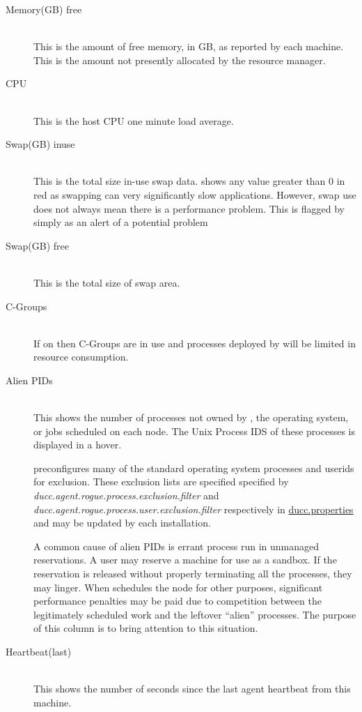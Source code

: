 \begin{description}
      \item[Memory(GB) free] \hfill \\
        This is the amount of free memory, in GB, as reported by each machine.
        This is the amount not presently allocated by the resource manager.
        
      \item[CPU] \hfill \\
        This is the host CPU one minute load average.
        
      \item[Swap(GB) inuse] \hfill \\
        This is the total size in-use swap data.  {\DUCC} shows any value greater than 0 in
        red as swapping can very significantly slow applications.  However, swap use does
        not always mean there is a performance problem.  This is flagged by {\DUCC} simply
        as an alert of a potential problem

      \item[Swap(GB) free] \hfill \\
        This is the total size of swap area.  

      \item[C-Groups] \hfill \\
        If on then C-Groups are in use and processes deployed by {\DUCC} will
        be limited in resource consumption.


      \item[Alien PIDs] \hfill \\
        This shows the number of processes not owned by {\DUCC}, the operating system, or
        jobs scheduled on each node.  The Unix Process IDS of these processes is displayed
        in a hover.

        {\DUCC} preconfigures many of the standard operating system processes and userids for exclusion.
        These exclusion lists are specified specified by 
        {\em ducc.agent.rogue.process.exclusion.filter}
        and 
        {\em ducc.agent.rogue.process.user.exclusion.filter}
        respectively in
        \hyperref[sec:default.ducc.properties]{ducc.properties}
        and may be updated by each installation.

        A common cause of alien PIDs is errant process run in unmanaged reservations.  A
        user may reserve a machine for use as a sandbox.  If the reservation is released
        without properly terminating all the processes, they may linger.  When {\DUCC} 
        schedules the node for other purposes, significant performance penalties may be
        paid due to competition between the legitimately scheduled work and the leftover
        ``alien'' processes.  The purpose of this column is to bring attention to this situation.


      \item[Heartbeat(last)] \hfill \\
        This shows the number of seconds since the last agent heartbeat from this machine.

      \end{description}
      
